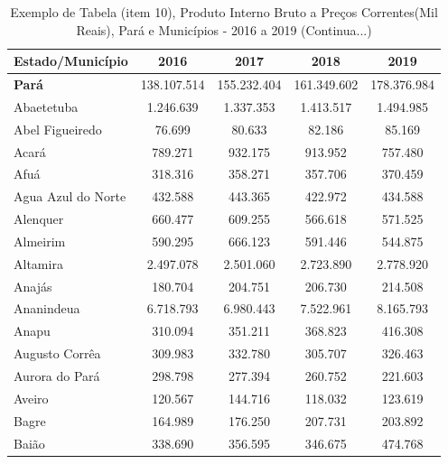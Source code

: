 \newpage
\begin{table}[H]
    \centering
    {
    \caption{Exemplo de Tabela (item 10), Produto Interno Bruto a Preços Correntes(Mil Reais), Pará e Municípios - 2016 a 2019 (Continua...)}  
    \label{item 10 regras1}
    \vspace{0.1cm}
\begin{tabular}{l|c|c|c|c}
  \hline\hline
  Estado/Município        &     2016    &      2017   &    2018     &     2019     \\
  \hline\hline
   \textbf{Pará}          & 138.107.514 & 155.232.404 & 161.349.602 & 178.376.984  \\
   Abaetetuba             & 1.246.639   & 1.337.353   & 1.413.517   & 1.494.985    \\
   Abel Figueiredo        &   76.699    &   80.633    &   82.186    &   85.169     \\
   Acará                  &   789.271   &   932.175   &  913.952    & 757.480      \\
   Afuá                   &   318.316   &  358.271    &  357.706    &  370.459     \\ 
   Agua Azul do Norte     &  432.588    &   443.365   &  422.972    &  434.588     \\
   Alenquer               &   660.477   &   609.255   &  566.618    &  571.525     \\
   Almeirim               &  590.295    &   666.123   &  591.446    &  544.875     \\
   Altamira               &  2.497.078  &  2.501.060  &  2.723.890  &  2.778.920   \\
   Anajás                 &  180.704    &  204.751    &  206.730    &  214.508     \\
   Ananindeua             &  6.718.793  &  6.980.443  &  7.522.961  &  8.165.793   \\
   Anapu                  &  310.094    &  351.211    &  368.823    &  416.308     \\
   Augusto Corrêa         & 309.983     &  332.780    &  305.707    &  326.463     \\
   Aurora do Pará         &  298.798    &  277.394    &  260.752    &  221.603      \\
   Aveiro                 &  120.567    &  144.716    &  118.032    &  123.619      \\
   Bagre                  &  164.989    &  176.250    &  207.731    &  203.892      \\
   Baião                  &  338.690    &  356.595    &  346.675    &  474.768      \\

\end{tabular}}
\end{table}
